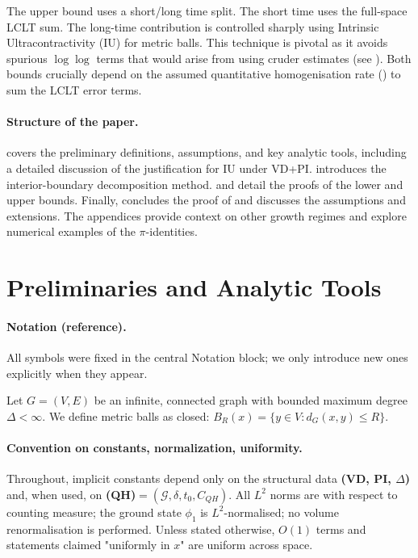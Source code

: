 \documentclass{article}
\numberwithin{equation}{section}
\theoremstyle{definition}
\theoremstyle{remark}
\newcommand{\cG}{\mathcal{G}}
\begin{document}
The upper bound uses a short/long time split. The short time uses the full-space LCLT sum. The long-time contribution is controlled sharply using Intrinsic Ultracontractivity (IU) for metric balls. This technique is pivotal as it avoids spurious $\log\log$ terms that would arise from using cruder estimates (see ). Both bounds crucially depend on the assumed quantitative homogenisation rate () to sum the LCLT error terms.

\paragraph{Structure of the paper.}
 covers the preliminary definitions, assumptions, and key analytic tools, including a detailed discussion of the justification for IU under VD+PI.  introduces the interior-boundary decomposition method.  and  detail the proofs of the lower and upper bounds. Finally,  concludes the proof of  and discusses the assumptions and extensions. The appendices provide context on other growth regimes and explore numerical examples of the $\pi$-identities.


\section{Preliminaries and Analytic Tools}\label{sec:prelim}

\paragraph{Notation (reference).} All symbols were fixed in the central Notation block; we only introduce new ones explicitly when they appear.

Let $G = (V,E)$ be an infinite, connected graph with bounded maximum degree $\Delta < \infty$. We define metric balls as closed: $B_R(x) = \{y \in V : d_G(x,y) \leq R\}$.

\paragraph{Convention on constants, normalization, uniformity.}
Throughout, implicit constants depend only on the structural data \textbf{(VD, PI, $\Delta$)} and, when used, on \textbf{(QH)}$=(\cG,\delta,t_0,C_{QH})$. All $L^2$ norms are with respect to counting measure; the ground state $\phi_1$ is $L^2$-normalised; no volume renormalisation is performed. Unless stated otherwise, $O(1)$ terms and statements claimed "uniformly in $x$" are uniform across space.
\end{document}
